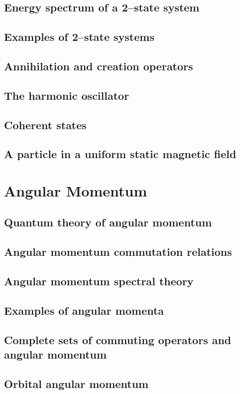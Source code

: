 \documentclass{article}
\begin{document}
\subsection{Energy spectrum of a 2–state system}
\subsection{Examples of 2–state systems}
\subsection{Annihilation and creation operators}
\subsection{The harmonic oscillator}
\subsection{Coherent states}
\subsection{A particle in a uniform static magnetic field}

\section{Angular Momentum}
\subsection{Quantum theory of angular momentum}
\subsection{Angular momentum commutation relations}
\subsection{Angular momentum spectral theory}
\subsection{Examples of angular momenta}
\subsection{Complete sets of commuting operators and angular momentum}
\subsection{Orbital angular momentum}
\end{document}
